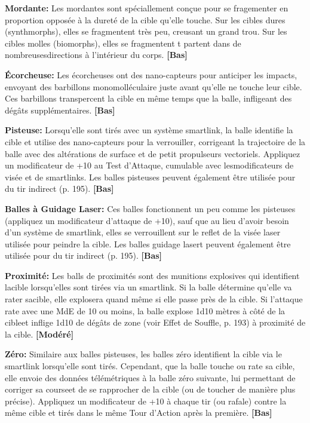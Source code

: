 \textbf{Mordante:} Les mordantes sont spéciallement conçue pour se fragementer en proportion opposée à la dureté de la cible qu'elle touche. Sur les cibles dures (synthmorphs), elles se fragmentent très peu, creusant un grand trou. Sur les cibles molles (biomorphs), elles se fragmentent t partent dans de nombreusesdirections à l'intérieur du corps. \textbf{[Bas]} 

\textbf{Écorcheuse:} Les écorcheuses ont des nano-capteurs pour anticiper les impacts, envoyant des barbillons monomolléculaire juste avant qu'elle ne touche leur cible. Ces barbillons transpercent la cible en même temps que la balle, infligeant des dégâts supplémentaires. \textbf{[Bas]} 

\textbf{Pisteuse:} Lorsqu'elle sont tirés avec un système smartlink, la balle identifie la cible et utilise des nano-capteurs pour la verrouiller, corrigeant la trajectoire de la balle avec des altérations de surface et de petit propulseurs vectoriels. Appliquez un modificateur de +10 au Test d'Attaque, cumulable avec lesmodificateurs de visée et de smartlinks. Les balles pisteuses peuvent également être utilisée pour du tir indirect (p. 195). \textbf{[Bas]} 

\textbf{Balles à Guidage Laser:} Ces balles fonctionnent un peu comme les pisteuses (appliquez un modificateur d'attaque de +10), sauf que au lieu d'avoir besoin d'un système de smartlink, elles se verrouillent sur le reflet de la visée laser utilisée pour peindre la cible. Les balles  guidage lasert peuvent également être utilisée pour du tir indirect (p. 195). \textbf{[Bas]} 

\textbf{Proximité:} Les balls de proximités sont des munitions explosives qui identifient lacible lorsqu'elles sont tirées via un smartlink. Si la balle détermine qu'elle va rater sacible, elle explosera quand même si elle passe près de la cible. Si l'attaque rate avec une MdE de 10 ou moins, la balle explose 1d10 mètres à côté de la cibleet inflige 1d10 de dégâts de zone (voir Effet de Souffle, p. 193) à proximité de la cible. \textbf{[Modéré]} 

\textbf{Zéro:} Similaire aux balles pisteuses, les balles zéro identifient la cible via le smartlink lorsqu'elle sont tirés. Cependant, que la balle touche ou rate sa cible, elle envoie des données télémétriques à la balle zéro suivante, lui permettant de corriger sa courseet de se rapprocher de la cible (ou de toucher de manière plus précise). Appliquez un modificateur de +10 à chaque tir (ou rafale) contre la même cible et tirés dans le même Tour d'Action après la première. \textbf{[Bas]} 

